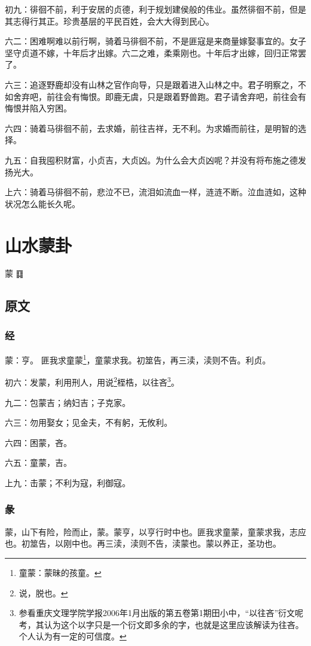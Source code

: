 \documentclass[12pt,oneside]{book}
\begin{document}
初九：徘徊不前，利于安居的贞德，利于规划建侯般的伟业。虽然徘徊不前，但是其志得行其正。珍贵基层的平民百姓，会大大得到民心。

六二：困难啊难以前行啊，骑着马徘徊不前，不是匪寇是来商量嫁娶事宜的。女子坚守贞道不嫁，十年后才出嫁。六二之难，柔乘刚也。十年后才出嫁，回归正常罢了。

六三：追逐野鹿却没有山林之官作向导，只是跟着进入山林之中。君子明察之，不如舍弃吧，前往会有悔恨。即鹿无虞，只是跟着野兽跑。君子请舍弃吧，前往会有悔恨并陷入穷困。

六四：骑着马徘徊不前，去求婚，前往吉祥，无不利。为求婚而前往，是明智的选择。

九五：自我囤积财富，小贞吉，大贞凶。为什么会大贞凶呢？并没有将布施之德发扬光大。

上六：骑着马徘徊不前，悲泣不已，流泪如流血一样，涟涟不断。泣血涟如，这种状况怎么能长久呢。



\chapter{山水蒙卦}
蒙 {\Large ䷃}

\section{原文}
\subsection{经}
蒙：亨。 匪我求童蒙\footnote{童蒙：蒙昧的孩童。}，童蒙求我。初筮告，再三渎，渎则不告。利贞。

初六：发蒙，利用刑人，用说\footnote{说，脱也。}桎梏，以往吝\footnote{参看重庆文理学院学报2006年1月出版的第五卷第1期田小中，“以往吝”衍文呢考，其认为这个以字只是一个衍文即多余的字，也就是这里应该解读为往吝。个人认为有一定的可信度。}。

九二：包蒙吉；纳妇吉；子克家。

六三：勿用娶女；见金夫，不有躬，无攸利。

六四：困蒙，吝。

六五：童蒙，吉。

上九：击蒙；不利为寇，利御寇。

\subsection{彖}
蒙，山下有险，险而止，蒙。蒙亨，以亨行时中也。匪我求童蒙，童蒙求我，志应也。初筮告，以刚中也。再三渎，渎则不告，渎蒙也。蒙以养正，圣功也。
\end{document}
